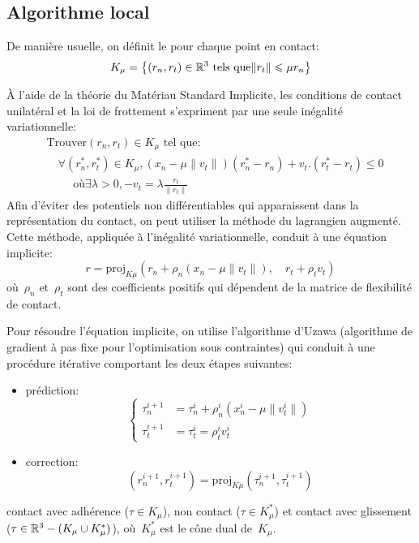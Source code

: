 \medskip
\subsection{Algorithme local}
De manière usuelle, on définit le  pour chaque point
en contact:
\begin{equation} K_\mu = \left\{ (r_n, r_t) \in \mathbb R^3 \text{ tels que} \|r_t\| \leqslant \mu r_n \right\} \end{equation}

À l'aide de la théorie du Matériau Standard Implicite, les conditions de contact unilatéral et la
loi de frottement s'expriment par une seule inégalité variationnelle:
\begin{equation}
\begin{aligned}
&\text{Trouver} (r_n, r_t) \in K_\mu \text{ tel que:}\\
&\quad\forall (r_n^*, r_t^*) \in K_\mu, (x_n - \mu \|v_t\|) (r_n^* - r_n) + v_t.(r_t^* - r_t) \le 0\\
&\quad\quad\text{ où} \exists\lambda>0, - v_t = \lambda \frac{r_t}{\|r_t\|}
\end{aligned}
\end{equation}
\medskipvm
Afin d'éviter des potentiels non différentiables qui apparaissent dans la représentation du contact,
on peut utiliser la méthode du lagrangien augmenté.
Cette méthode, appliquée à l'inégalité variationnelle, conduit à une équation implicite:
\begin{equation} r = \mathrm{proj}_{K\mu} (r_n + \rho_n(x_n - \mu \|v_t\|), \quad r_t + \rho_t v_t) \end{equation}
où~$\rho_n$ et~$\rho_t$ sont des coefficients positifs qui dépendent de la matrice de flexibilité
de contact.

Pour résoudre l'équation implicite, on utilise l'algorithme d'Uzawa
(algorithme de gradient à pas fixe pour l'optimisation sous contraintes) qui conduit à une procédure
itérative comportant les deux étapes suivantes:
\begin{itemize}
  \item prédiction:
  \begin{equation}\left\{\begin{aligned}
	\tau_n^{i+1}&=\tau_n^i+\rho_n^i(x_n^i-\mu\|v_t^i\|)\\
	\tau_t^{i+1}&=\tau_t^i=\rho_t^iv_t^i
	\end{aligned}\right.\end{equation}
  \item correction:
  \begin{equation}(r_n^{i+1},r_t^{i+1}) = \mathrm{proj}_{K\mu}(\tau_ n^{i+1}, \tau_t^{i+1})\end{equation}
\end{itemize}
contact avec adhérence ($\tau\in K_\mu$), non contact ($\tau\in K_\mu^*$) et contact avec
glissement ($\tau\in\mathbb R^3- (K_\mu \cup K_\mu^*)$), où~$K_\mu^*$ est le cône dual de~$K_\mu$.

